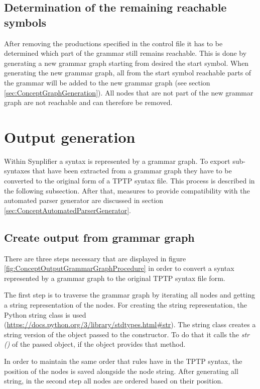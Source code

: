 \subsection{Determination of the remaining reachable symbols}\label{sec:ConceptDerterminingRemainingReachable}
After removing the productions specified in the control file it has to be determined which part of the grammar still remains reachable.
This is done by generating a new grammar graph starting from desired the start symbol.
When generating the new grammar graph, all from the start symbol reachable parts of the grammar will be added to the new grammar graph (see section \ref{sec:ConceptGraphGeneration}).
All nodes that are not part of the new grammar graph are not reachable and can therefore be removed.

\section{Output generation}\label{sec:ConceptOutputGeneration}
Within \ac{Synplifier} a syntax is represented by a grammar graph.
To export sub-syntaxes that have been extracted from a grammar graph they have to be converted to the original form of a \ac{TPTP} syntax file. This process is described in the following subsection.
After that, measures to provide compatibility with the automated parser generator are discussed in section \ref{sec:ConceptAutomatedParserGenerator}.

\subsection{Create output from grammar graph}\label{sec:ConceptOutputGrammarGraph}
There are three steps necessary that are displayed in figure \ref{fig:ConceptOutputGrammarGraphProcedure} in order to convert a syntax represented by a grammar graph to the original \ac{TPTP} syntax file form.

The first step is to traverse the grammar graph by iterating all nodes and getting a string representation of the nodes.
For creating the string representation, the Python string class is used (\url{https://docs.python.org/3/library/stdtypes.html#str}). The string class creates a string version of the object passed to the constructor.
To do that it calls the \textit{\textunderscore \textunderscore str \textunderscore \textunderscore ()} of the passed object, if the object provides that method.

In order to maintain the same order that rules have in the \ac{TPTP} syntax, the position of the nodes is saved alongside the node string. 
After generating all string, in the second step all nodes are ordered based on their position. 


